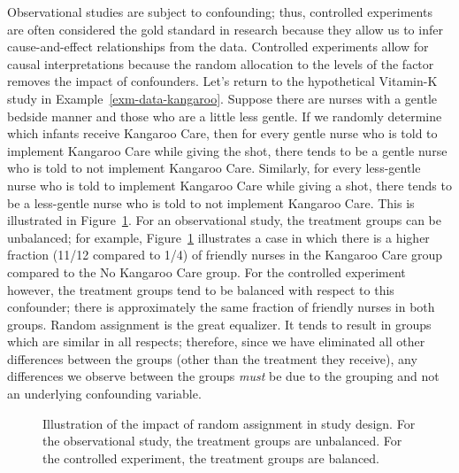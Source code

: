 \documentclass[
  letterpaper,
  DIV=11,
  numbers=noendperiod]{scrreprt}
\theoremstyle{plain}
\theoremstyle{definition}
\theoremstyle{definition}
\theoremstyle{remark}
\begin{document}
Observational studies are subject to confounding; thus, controlled
experiments are often considered the gold standard in research because
they allow us to infer cause-and-effect relationships from the data.
Controlled experiments allow for causal interpretations because the
random allocation to the levels of the factor removes the impact of
confounders. Let's return to the hypothetical Vitamin-K study in
Example~\ref{exm-data-kangaroo}. Suppose there are nurses with a gentle
bedside manner and those who are a little less gentle. If we randomly
determine which infants receive Kangaroo Care, then for every gentle
nurse who is told to implement Kangaroo Care while giving the shot,
there tends to be a gentle nurse who is told to not implement Kangaroo
Care. Similarly, for every less-gentle nurse who is told to implement
Kangaroo Care while giving a shot, there tends to be a less-gentle nurse
who is told to not implement Kangaroo Care. This is illustrated in
Figure~\ref{fig-data-randomization}. For an observational study, the
treatment groups can be unbalanced; for example,
Figure~\ref{fig-data-randomization} illustrates a case in which there is
a higher fraction (11/12 compared to 1/4) of friendly nurses in the
Kangaroo Care group compared to the No Kangaroo Care group. For the
controlled experiment however, the treatment groups tend to be balanced
with respect to this confounder; there is approximately the same
fraction of friendly nurses in both groups. Random assignment is the
great equalizer. It tends to result in groups which are similar in all
respects; therefore, since we have eliminated all other differences
between the groups (other than the treatment they receive), any
differences we observe between the groups \emph{must} be due to the
grouping and not an underlying confounding variable.

\begin{figure}


\caption{\label{fig-data-randomization}Illustration of the impact of
random assignment in study design. For the observational study, the
treatment groups are unbalanced. For the controlled experiment, the
treatment groups are balanced.}

\end{figure}%
\end{document}
